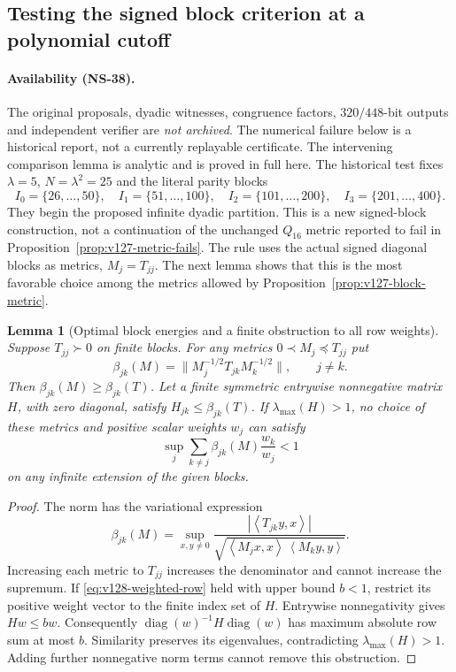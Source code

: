 \documentclass[11pt]{article}
\newtheorem{lemma}[theorem]{Lemma}
\theoremstyle{remark}
\newcommand{\ip}[2]{\left\langle #1,#2\right\rangle}
\begin{document}
\subsection*{Testing the signed block criterion at a polynomial cutoff}
\label{sec:v128-test}
\paragraph{Availability (NS-38).} The original proposals, dyadic
witnesses, congruence factors, $320/448$-bit outputs and independent
verifier are \emph{not archived}. The numerical failure below is a
historical report, not a currently replayable certificate. The intervening
comparison lemma is analytic and is proved in full here.
The historical test fixes $\lambda=5$, $N=\lambda^2=25$ and the literal
parity blocks
\[
 I_0=\{26,\ldots,50\},\quad I_1=\{51,\ldots,100\},\quad
 I_2=\{101,\ldots,200\},\quad I_3=\{201,\ldots,400\}.
\]
They begin the proposed infinite dyadic partition. This is a new
signed-block construction, not a continuation of the unchanged
$Q_{16}$ metric reported to fail in Proposition~\ref{prop:v127-metric-fails}.
The rule uses the actual signed diagonal blocks as metrics,
$M_j=T_{jj}$. The next lemma shows that this is the most favorable
choice among the metrics allowed by Proposition~\ref{prop:v127-block-metric}.

\begin{lemma}[Optimal block energies and a finite obstruction to all row weights]
\label{lem:v128-comparison-obstruction}
Suppose $T_{jj}\succ0$ on finite blocks. For any metrics
$0\prec M_j\preceq T_{jj}$ put
\[
 \beta_{jk}(M)=\|M_j^{-1/2}T_{jk}M_k^{-1/2}\|,\qquad j\ne k.
\]
Then $\beta_{jk}(M)\ge\beta_{jk}(T)$. Let a finite symmetric
entrywise nonnegative matrix $H$, with zero diagonal, satisfy
$H_{jk}\le\beta_{jk}(T)$. If $\lambda_{\max}(H)>1$, no choice of
these metrics and positive scalar weights $w_j$ can satisfy
\begin{equation}\label{eq:v128-weighted-row}
 \sup_j\sum_{k\ne j}\beta_{jk}(M)\frac{w_k}{w_j}<1
\end{equation}
on any infinite extension of the given blocks.
\end{lemma}
\begin{proof}
The norm has the variational expression
\[
 \beta_{jk}(M)=\sup_{x,y\ne0}
 \frac{|\ip{T_{jk}y}{x}|}
 {\sqrt{\ip{M_jx}{x}\,\ip{M_ky}{y}}}.
\]
Increasing each metric to $T_{jj}$ increases the denominator and
cannot increase the supremum. If \eqref{eq:v128-weighted-row} held
with upper bound $b<1$, restrict its positive weight vector to the
finite index set of $H$. Entrywise nonnegativity gives $Hw\le bw$.
Consequently $\operatorname{diag}(w)^{-1}H\operatorname{diag}(w)$
has maximum absolute row sum at most $b$. Similarity preserves its
eigenvalues, contradicting $\lambda_{\max}(H)>1$. Adding further
nonnegative norm terms cannot remove this obstruction.
\end{proof}
\end{document}
